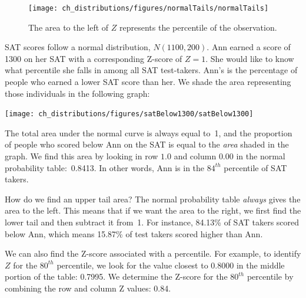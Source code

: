 \begin{figure}[h]
  \centering
  \texttt{[image: ch\_distributions/figures/normalTails/normalTails]}
  \caption{The area to the left of $Z$ represents the
      percentile of the observation.}
\end{figure}

\begin{examplewrap}
\begin{nexample}{
    SAT scores follow a normal distribution, $N(1100, 200)$.
    Ann earned a score of 1300 on her SAT with
    a corresponding Z-score of $Z = 1$.
    She would like to know what percentile she falls in among
    all SAT test-takers.}
  Ann's  is the percentage of people who
  earned a lower SAT score than her.
  We shade the area representing those individuals in the
  following graph:
  \begin{center}
  \texttt{[image: ch\_distributions/figures/satBelow1300/satBelow1300]}
  \end{center}
  The total area under the normal curve is always equal to~1,
  and the proportion of people who scored below Ann on the SAT
  is equal to the \emph{area} shaded in the graph.
  We find this area by looking in row $1.0$ and column $0.00$
  in the normal probability table:~0.8413.
  In other words, Ann is in the $84^{th}$ percentile of
  SAT takers.
\end{nexample}
\end{examplewrap}

\begin{examplewrap}
\begin{nexample}{How do we find an upper tail area?}
  The normal probability table \emph{always} gives the area
  to the left.
  This means that if we want the area to the right,
  we first find the lower tail and then subtract it from~1.
  For instance, 84.13\% of SAT takers scored below Ann,
  which means 15.87\% of test takers scored higher than Ann.
\end{nexample}
\end{examplewrap}

We can also find the Z-score associated with a percentile.
For example, to identify $Z$ for the $80^{th}$ percentile,
we look for the value closest to 0.8000 in the middle portion
of the table: 0.7995.
We determine the Z-score for the $80^{th}$ percentile by
combining the row and column Z values: 0.84.

